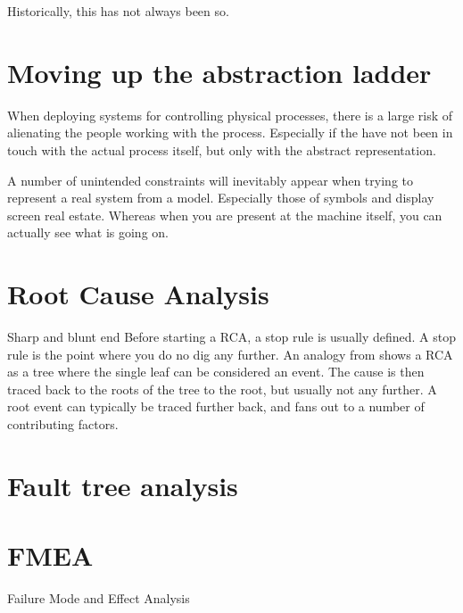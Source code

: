 Historically, this has not always been so.
\section{Moving up the abstraction ladder}
When deploying systems for controlling physical processes, there is a large risk of alienating the people working with the process. Especially if the have not been in touch with the actual process itself, but only with the abstract representation.

A number of unintended constraints will inevitably appear when trying to represent a real system from a model. Especially those of symbols and display screen real estate. Whereas when you are present at the machine itself, you can actually see what is going on.

\cite{hollnagel2005joint}%

\section{Root Cause Analysis}
Sharp and blunt end
Before starting a RCA, a stop rule is usually defined. A stop rule is the point where you do no dig any further. An analogy from \cite{hollnagel2004barriers} shows a RCA as a tree where the single leaf can be considered an event. The cause is then traced back to the roots of the tree to the root, but usually not any further. A root event can typically be traced further back, and fans out to a number of contributing factors.


\section{Fault tree analysis}

\section{FMEA}
Failure Mode and Effect Analysis


